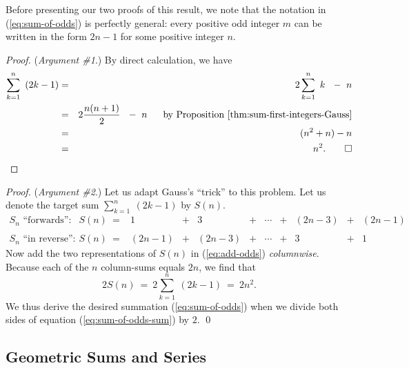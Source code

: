 \documentclass{article}
\begin{document}
Before presenting our two proofs of this result, we note that the
notation in (\ref{eq:sum-of-odds}) is perfectly general: every positive
odd integer $m$ can be written in the form $2n-1$ for some positive
integer $n$.

\smallskip

\begin{proof}
({\it Argument \#1}.)
%
By direct calculation, we have
\begin{eqnarray*}
\sum_{k=1}^n \ \left( 2k-1 \right)
   & = & 2 \sum_{k=1}^n \ k \ \ - \ n \\
   & = & 2 \frac{n (n+1)}{2} \ \ - \ n \ \ \ \ \mbox{ by
  Proposition~\ref{thm:sum-first-integers-Gauss}} \\
   & = & (n^2 + n) - n \\
   & = & n^2. \hfill \qed
\end{eqnarray*}
\end{proof}

\medskip

\begin{proof}
({\it Argument \#2}.)
%
Let us adapt Gauss's ``trick'' to this problem.  Let us denote the
target sum $\sum_{k=1}^n \ (2k-1)$ by $S(n)$. 
\begin{equation}
\label{eq:add-odds}
\begin{array}{llccccccccc}
\mbox{$S_n$ ``forwards'':} &
S(n) \ = 
& 1 & + & 3 & + & \cdots & + & (2n-3) & + & (2n-1) \\
 & & & & & & & & & &  \\
\mbox{$S_n$ ``in reverse'':} &
S(n) \ =
& (2n-1) & + & (2n-3) & + & \cdots & + & 3 & + & 1
\end{array}
\end{equation}
Now add the two representations of $S(n)$ in (\ref{eq:add-odds}) {\em
  columnwise}.  Because each of the $n$ column-sums equals $2n$, we
find that
\begin{equation}
\label{eq:sum-of-odds-sum}
2 S(n) \ = \ 2 \sum_{k=1}^n \ (2k-1) \ = \ 2n^2.
\end{equation}
We thus derive the desired summation (\ref{eq:sum-of-odds}) when we
divide both sides of equation (\ref{eq:sum-of-odds-sum}) by $2$.  \qed
\end{proof}

\subsection{Geometric Sums and Series}
\label{sec:geometric-sums}
\end{document}
